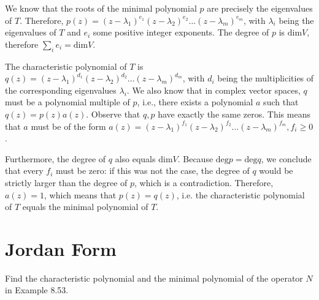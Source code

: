 \begin{solution}

    We know that the roots of the minimal polynomial $p$ are precisely the eigenvalues of $T$. Therefore, $p(z) = (z - \lambda_1)^{e_1}(z - \lambda_2)^{e_2} \ldots (z - \lambda_m)^{e_m}$, with $\lambda_i$ being the eigenvalues of $T$ and $e_i$ some positive integer exponents. The degree of $p$ is $\text{dim} V$, therefore $\sum_i e_i = \text{dim} V$.

    The characteristic polynomial of $T$ is $q(z) = (z - \lambda_1)^{d_1}(z - \lambda_2)^{d_2} \ldots (z - \lambda_m)^{d_m}$, with $d_i$ being the multiplicities of the corresponding eigenvalues $\lambda_i$. We also know that in complex vector spaces, $q$ must be a polynomial multiple of $p$, i.e., there exists a polynomial $a$ such that $q(z) = p(z)a(z)$. Observe that $q, p$ have exactly the same zeros. This means that $a$ must be of the form $a(z) = (z - \lambda_1)^{f_1}(z - \lambda_2)^{f_2}\ldots (z - \lambda_m)^{f_m}, f_i \geq 0$. 
    
    Furthermore, the degree of $q$ also equals $\text{dim} V$. Because $\text{deg} p = \text{deg} q$, we conclude that every $f_i$ must be zero: if this was not the case, the degree of $q$ would be strictly larger than the degree of $p$, which is a contradiction. Therefore, $a(z) = 1$, which means that $p(z) = q(z)$, i.e. the characteristic polynomial of $T$ equals the minimal polynomial of $T$.
\end{solution}

\newpage
\section{Jordan Form}

\begin{exercise}{1}
    Find the characteristic polynomial and the minimal polynomial of the operator $N$ in Example 8.53.
\end{exercise}

